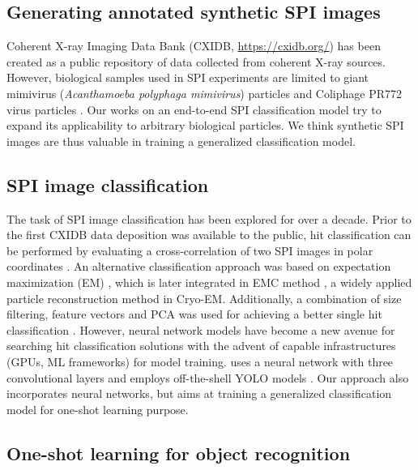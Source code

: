 \subsection{Generating annotated synthetic SPI images}


Coherent X-ray Imaging Data Bank (CXIDB, \url{https://cxidb.org/})
\cite{maiaCoherentXrayImaging2012} has been created as a public repository of
data collected from coherent X-ray sources.  However, biological samples used in
SPI experiments are limited to giant mimivirus (\textit{Acanthamoeba polyphaga
mimivirus}) particles \cite{ekebergThreeDimensionalReconstructionGiant2015} and
Coliphage PR772 virus particles \cite{reddyCoherentSoftXray2017a,
liDiffractionDataAerosolized2020a}. Our works on an end-to-end SPI
classification model try to expand its applicability to arbitrary biological
particles.  We think synthetic SPI images are thus valuable in training a
generalized classification model.  



\subsection{SPI image classification}

The task of SPI image classification has been explored for over a decade. Prior
to the first CXIDB data deposition \cite{seibertSingleMimivirusParticles2011a}
was available to the public, hit classification can be performed by evaluating a
cross-correlation of two SPI images in polar coordinates
\cite{bortelClassificationAveragingRandom2009}.  An alternative classification
approach was based on expectation maximization (EM)
\cite{dempsterMaximumLikelihoodIncomplete1977}, which is later integrated in EMC
method \cite{lohReconstructionAlgorithmSingleparticle2009}, a widely applied
particle reconstruction method in Cryo-EM.  Additionally, a combination of size
filtering, feature vectors and PCA was used for achieving a better single hit
classification \cite{bobkovSortingAlgorithmsSingleparticle2015}.  However,
neural network models have become a new avenue for searching hit classification
solutions with the advent of capable infrastructures (GPUs, ML frameworks) for
model training. \cite{shiEvaluationPerformanceClassification2019} uses a neural
network with three convolutional layers and
\cite{ignatenkoClassificationDiffractionPatterns2021} employs off-the-shell YOLO
models \cite{redmonYOLO9000BetterFaster2016, redmonYOLOv3IncrementalImprovement}
.  Our approach also incorporates neural networks, but aims at training a
generalized classification model for one-shot learning purpose.  


\subsection{One-shot learning for object recognition}



